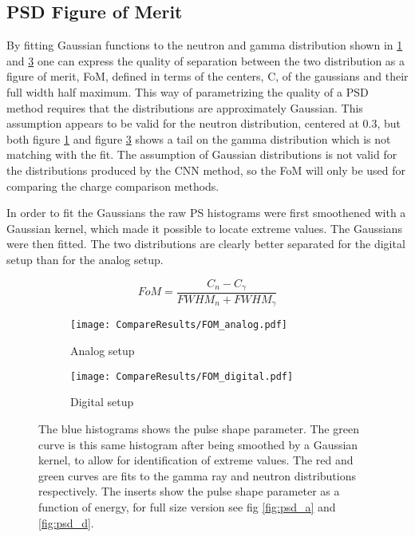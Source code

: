 \documentclass[main.tex]{subfiles}
\begin{document}
\subsection{PSD Figure of Merit}
By fitting Gaussian functions to the neutron and gamma distribution shown in \ref{fig:fom_analog} and \ref{fig:fom_digital} one can express the quality of separation between the two distribution as a figure of merit, FoM, defined in terms of the centers, C, of the gaussians and their full width half maximum. This way of parametrizing the quality of a PSD method requires that the distributions are approximately Gaussian. This assumption appears to be valid for the neutron distribution, centered at 0.3, but both figure \ref{fig:fom_analog} and figure \ref{fig:fom_digital} shows a tail on the gamma distribution which is not matching with the fit. The assumption of Gaussian distributions is not valid for the distributions produced by the CNN method, so the FoM will only be used for comparing the charge comparison methods. 

In order to fit the Gaussians the raw PS histograms were first smoothened with a Gaussian kernel, which made it possible to locate extreme values. The Gaussians were then fitted. The two distributions are clearly better separated for the digital setup than for the analog setup. 

\begin{equation}
FoM = \frac{C_n - C_\gamma}{FWHM_n + FWHM_\gamma}
\end{equation}

\begin{figure}[ht]
	\begin{subfigure}[b]{\textwidth}
	    \centering
    	    \texttt{[image: CompareResults/FOM\_analog.pdf]}
        	\caption{Analog setup}
	    \label{fig:fom_analog} 
	\end{subfigure}
	\begin{subfigure}[b]{\textwidth}
    	\centering
        	\texttt{[image: CompareResults/FOM\_digital.pdf]}
        	\caption{Digital setup}
    	\label{fig:fom_digital} 
    \end{subfigure}
    \caption{The blue histograms shows the pulse shape parameter. The green curve is this same histogram after being smoothed by a Gaussian kernel, to allow for identification of extreme values. The red and green curves are fits to the gamma ray and neutron distributions respectively. The inserts show the pulse shape parameter as a function of energy, for full size version see fig \ref{fig:psd_a} and \ref{fig:psd_d}. }
\end{figure}
\end{document}
